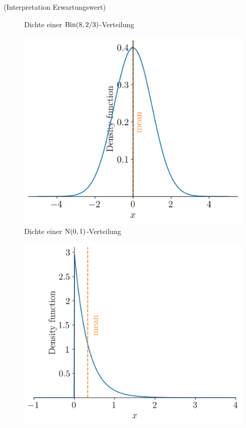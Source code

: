 \begin{Beispiel}{(Interpretation Erwartungswert)}
\begin{minipage}{0.5\linewidth}
\begin{figure}[H]
\begin{center}
\caption{\centering Dichte einer $\operatorname{Bin}(8, 2/3)$-Verteilung}
\end{center}
\end{figure}
\end{minipage}
\begin{minipage}{0.5\linewidth}
\begin{figure}[H]
\begin{center}
\includegraphics[width=\linewidth]{./Section/Momente/Erwartungswert Normal.png}
\caption{\centering Dichte einer $\operatorname{N}(0, 1)$-Verteilung}
\end{center}
\end{figure}
\end{minipage}
\begin{minipage}{0.5\linewidth}
\begin{figure}[H]
\begin{center}
\includegraphics[width=\linewidth]{./Section/Momente/Erwartungswert Exponential.png}

\end{center}
\end{figure}
\end{minipage}
\end{Beispiel}
